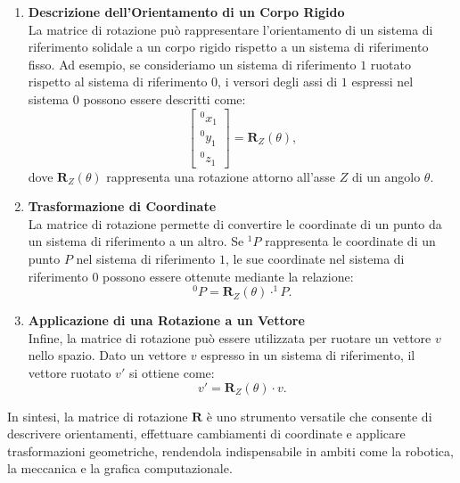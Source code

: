\documentclass[11pt, a4paper]{report}
\begin{document}
\begin{enumerate}
    \item \textbf{Descrizione dell'Orientamento di un Corpo Rigido} \\
    La matrice di rotazione può rappresentare l'orientamento di un sistema di riferimento solidale a un corpo rigido rispetto a un sistema di riferimento fisso. Ad esempio, se consideriamo un sistema di riferimento $1$ ruotato rispetto al sistema di riferimento $0$, i versori degli assi di $1$ espressi nel sistema $0$ possono essere descritti come:
    \[
    \begin{bmatrix}
    ^{0}x_{1} \\
    ^{0}y_{1} \\
    ^{0}z_{1}
    \end{bmatrix}
    = \mathbf{R}_{Z}(\theta),
    \]
    dove $\mathbf{R}_{Z}(\theta)$ rappresenta una rotazione attorno all'asse $Z$ di un angolo $\theta$.

    \item \textbf{Trasformazione di Coordinate} \\
    La matrice di rotazione permette di convertire le coordinate di un punto da un sistema di riferimento a un altro. Se $^{1}P$ rappresenta le coordinate di un punto $P$ nel sistema di riferimento $1$, le sue coordinate nel sistema di riferimento $0$ possono essere ottenute mediante la relazione:
    \[
    ^{0}P = \mathbf{R}_{Z}(\theta) \cdot ^{1}P.
    \]

    \item \textbf{Applicazione di una Rotazione a un Vettore} \\
    Infine, la matrice di rotazione può essere utilizzata per ruotare un vettore $v$ nello spazio. Dato un vettore $v$ espresso in un sistema di riferimento, il vettore ruotato $v'$ si ottiene come:
    \[
    v' = \mathbf{R}_{Z}(\theta) \cdot v.
    \]
\end{enumerate}

In sintesi, la matrice di rotazione $\mathbf{R}$ è uno strumento versatile che consente di descrivere orientamenti, effettuare cambiamenti di coordinate e applicare trasformazioni geometriche, rendendola indispensabile in ambiti come la robotica, la meccanica e la grafica computazionale.
\end{document}
